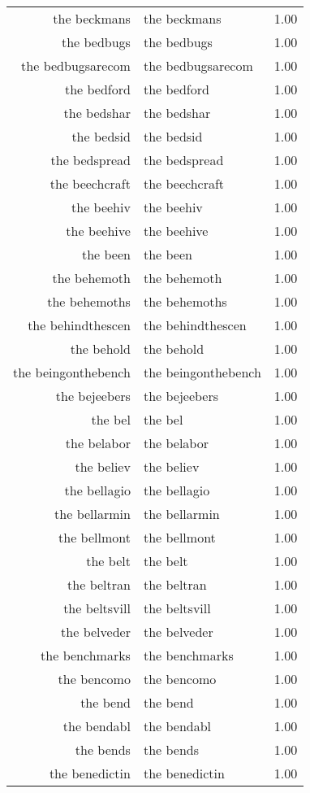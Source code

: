 \begin{table}[ht]
\begin{tabular}{rlr}
  the beckmans & the beckmans & 1.00 \\ 
  the bedbugs & the bedbugs & 1.00 \\ 
  the bedbugsarecom & the bedbugsarecom & 1.00 \\ 
  the bedford & the bedford & 1.00 \\ 
  the bedshar & the bedshar & 1.00 \\ 
  the bedsid & the bedsid & 1.00 \\ 
  the bedspread & the bedspread & 1.00 \\ 
  the beechcraft & the beechcraft & 1.00 \\ 
  the beehiv & the beehiv & 1.00 \\ 
  the beehive & the beehive & 1.00 \\ 
  the been & the been & 1.00 \\ 
  the behemoth & the behemoth & 1.00 \\ 
  the behemoths & the behemoths & 1.00 \\ 
  the behindthescen & the behindthescen & 1.00 \\ 
  the behold & the behold & 1.00 \\ 
  the beingonthebench & the beingonthebench & 1.00 \\ 
  the bejeebers & the bejeebers & 1.00 \\ 
  the bel & the bel & 1.00 \\ 
  the belabor & the belabor & 1.00 \\ 
  the believ & the believ & 1.00 \\ 
  the bellagio & the bellagio & 1.00 \\ 
  the bellarmin & the bellarmin & 1.00 \\ 
  the bellmont & the bellmont & 1.00 \\ 
  the belt & the belt & 1.00 \\ 
  the beltran & the beltran & 1.00 \\ 
  the beltsvill & the beltsvill & 1.00 \\ 
  the belveder & the belveder & 1.00 \\ 
  the benchmarks & the benchmarks & 1.00 \\ 
  the bencomo & the bencomo & 1.00 \\ 
  the bend & the bend & 1.00 \\ 
  the bendabl & the bendabl & 1.00 \\ 
  the bends & the bends & 1.00 \\ 
  the benedictin & the benedictin & 1.00 \\ 

\end{tabular}
\end{table}
